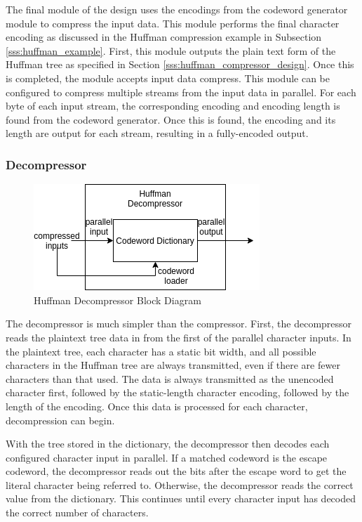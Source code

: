 \documentclass[doublespace,nopageskip]{VTthesis}
\begin{document}
The final module of the design uses the encodings from the codeword generator module to compress the input data. This module performs the final character encoding as discussed in the Huffman compression example in Subsection \ref{sss:huffman_example}. First, this module outputs the plain text form of the Huffman tree as specified in Section \ref{sss:huffman_compressor_design}. Once this is completed, the module accepts input data compress. This module can be configured to compress multiple streams from the input data in parallel. For each byte of each input stream, the corresponding encoding and encoding length is found from the codeword generator. Once this is found, the encoding and its length are output for each stream, resulting in a fully-encoded output.

\subsubsection{Decompressor}\label{sss:huffman_decompressor_implementation}

\begin{figure}[htb]
	\centering
	\includegraphics[scale=1]{Huffman Decompressor Block Diagram.png}
	\caption{Huffman Decompressor Block Diagram}
	\label{fig:huffman_decompressor_block_diagram}
\end{figure}

The decompressor is much simpler than the compressor. First, the decompressor reads the plaintext tree data in from the first of the parallel character inputs. In the plaintext tree, each character has a static bit width, and all possible characters in the Huffman tree are always transmitted, even if there are fewer characters than that used. The data is always transmitted as the unencoded character first, followed by the static-length character encoding, followed by the length of the encoding. Once this data is processed for each character, decompression can begin.

With the tree stored in the dictionary, the decompressor then decodes each configured character input in parallel. If a matched codeword is the escape codeword, the decompressor reads out the bits after the escape word to get the literal character being referred to. Otherwise, the decompressor reads the correct value from the dictionary. This continues until every character input has decoded the correct number of characters.
\end{document}

